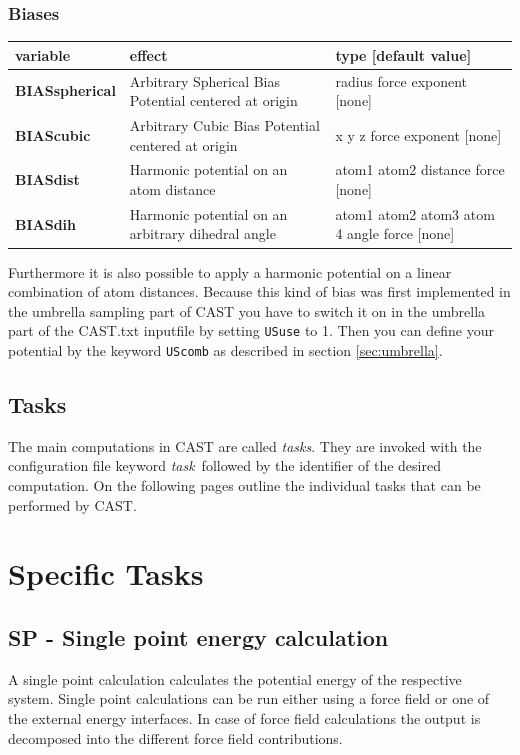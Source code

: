 \documentclass[10pt,a4paper]{article} %
\begin{document}
\subsubsection{Biases}

\begin{longtable}{|p{3cm}|p{5cm}|p{3cm}|}
	variable & effect & type [default value] \\
	\hline
	\textbf{BIASspherical} & Arbitrary Spherical Bias Potential centered at origin & radius force exponent [none] \\
	\textbf{BIAScubic} & Arbitrary Cubic Bias Potential centered at origin & x y z force exponent [none] \\
	\textbf{BIASdist} & Harmonic potential on an atom distance & atom1 atom2 distance force [none] \\
	\textbf{BIASdih} & Harmonic potential on an arbitrary dihedral angle & atom1 atom2 atom3 atom 4 angle force [none]
\end{longtable} 

Furthermore it is also possible to apply a harmonic potential on a linear combination of atom distances. Because this kind of bias was first implemented in the umbrella sampling part of CAST you have to switch it on in the umbrella part of the CAST.txt inputfile by setting \texttt{USuse} to 1. Then you can define your potential by the keyword \texttt{UScomb} as described in section \ref{sec:umbrella}.
	
	
	\subsection{Tasks}
	The main computations in \ac{CAST} are called \textit{tasks}. They are invoked with the configuration file keyword \glqq\textit{task}\grqq~followed by the identifier of the desired computation. On the following pages outline the individual tasks that can be performed by \ac{CAST}.

	\newpage

	\section{Specific Tasks}

	\subsection{SP - Single point energy calculation}
	A single point calculation calculates the potential energy of the respective system. Single point calculations can be run either using a force field or one of the external energy interfaces. In case of force field calculations the output is decomposed into the different force field contributions.\\
\end{document}

